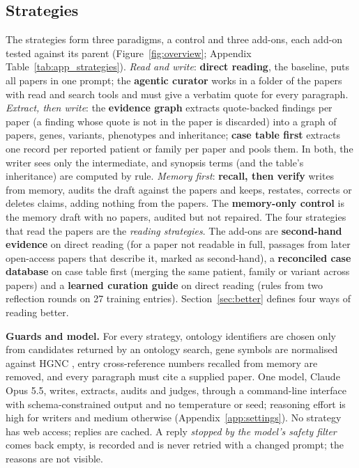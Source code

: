 \documentclass{article} %
\begin{document}
\subsection{Strategies}
\label{sec:strategies}
The strategies form three paradigms, a control and three add-ons, each add-on tested against its parent (Figure~\ref{fig:overview}; Appendix Table~\ref{tab:app_strategies}). \emph{Read and write}: \textbf{direct reading}, the baseline, puts all papers in one prompt; the \textbf{agentic curator} works in a folder of the papers with read and search tools and must give a verbatim quote for every paragraph. \emph{Extract, then write}: the \textbf{evidence graph} extracts quote-backed findings per paper (a finding whose quote is not in the paper is discarded) into a graph of papers, genes, variants, phenotypes and inheritance; \textbf{case table first} extracts one record per reported patient or family per paper and pools them. In both, the writer sees only the intermediate, and synopsis terms (and the table's inheritance) are computed by rule. \emph{Memory first}: \textbf{recall, then verify} writes from memory, audits the draft against the papers and keeps, restates, corrects or deletes claims, adding nothing from the papers. The \textbf{memory-only control} is the memory draft with no papers, audited but not repaired. The four strategies that read the papers are the \emph{reading strategies}. The add-ons are \textbf{second-hand evidence} on direct reading (for a paper not readable in full, passages from later open-access papers that describe it, marked as second-hand), a \textbf{reconciled case database} on case table first (merging the same patient, family or variant across papers) and a \textbf{learned curation guide} on direct reading (rules from two reflection rounds on 27 training entries). Section~\ref{sec:better} defines four ways of reading better.

\textbf{Guards and model.} For every strategy, ontology identifiers are chosen only from candidates returned by an ontology search, gene symbols are normalised against HGNC \citep{seal2023genenames}, entry cross-reference numbers recalled from memory are removed, and every paragraph must cite a supplied paper. One model, Claude Opus 5.5, writes, extracts, audits and judges, through a command-line interface with schema-constrained output and no temperature or seed; reasoning effort is high for writers and medium otherwise (Appendix~\ref{app:settings}). No strategy has web access; replies are cached. A reply \emph{stopped by the model's safety filter} comes back empty, is recorded and is never retried with a changed prompt; the reasons are not visible.
\end{document}
